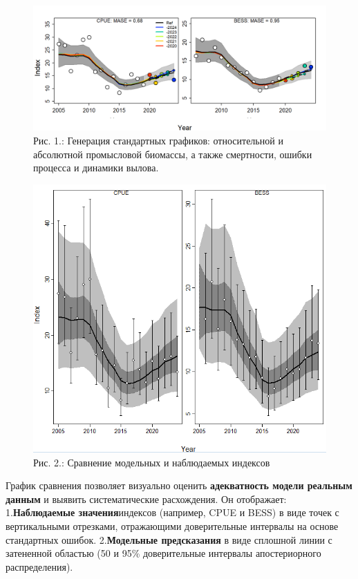 \documentclass[
  letterpaper,
  DIV=11,
  numbers=noendperiod]{scrreprt}
\begin{document}
\begin{figure}[H]

{\centering \includegraphics[width=0.8\linewidth,height=\textheight,keepaspectratio]{images/JABBA10.png}

}

\caption{Рис. 1.: Генерация стандартных графиков: относительной и
абсолютной промысловой биомассы, а также смертности, ошибки процесса и
динамики вылова.}

\end{figure}%

\begin{figure}[H]

{\centering \includegraphics[width=0.6\linewidth,height=\textheight,keepaspectratio]{images/JABBA2.png}

}

\caption{Рис. 2.: Сравнение модельных и наблюдаемых индексов}

\end{figure}%

График сравнения позволяет визуально оценить \textbf{адекватность модели
реальным данным} и выявить систематические расхождения. Он отображает:
1.\textbf{Наблюдаемые значения}индексов (например, CPUE и BESS) в виде
точек с вертикальными отрезками, отражающими доверительные интервалы на
основе стандартных ошибок. 2.\textbf{Модельные предсказания} в виде
сплошной линии с затененной областью (50 и 95\% доверительные интервалы
апостериорного распределения).
\end{document}
